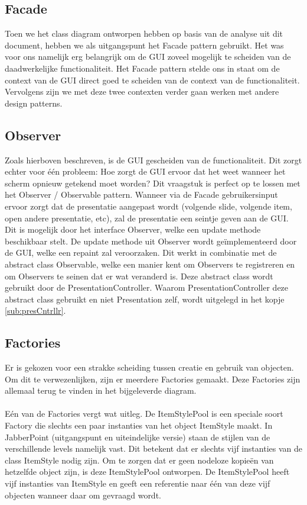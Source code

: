 \documentclass[a4paper]{article}
\newcommand{\1}[0]{\'{e}\'{e}n}
\begin{document}
\subsection{Facade}
Toen we het class diagram ontworpen hebben op basis van de analyse uit dit document, hebben we als uitgangspunt het Facade pattern gebruikt. Het was voor ons namelijk erg belangrijk om de GUI zoveel mogelijk te scheiden van de daadwerkelijke functionaliteit. Het Facade pattern stelde ons in staat om de context van de GUI direct goed te scheiden van de context van de functionaliteit. Vervolgens zijn we met deze twee contexten verder gaan werken met andere design patterns.

\subsection{Observer}
Zoals hierboven beschreven, is de GUI gescheiden van de functionaliteit. Dit zorgt echter voor \1 probleem: Hoe zorgt de GUI ervoor dat het weet wanneer het scherm opnieuw getekend moet worden? Dit vraagstuk is perfect op te lossen met het Observer / Observable pattern. Wanneer via de Facade gebruikersinput ervoor zorgt dat de presentatie aangepast wordt (volgende slide, volgende item, open andere presentatie, etc), zal de presentatie een seintje geven aan de GUI. Dit is mogelijk door het interface Observer, welke een update methode beschikbaar stelt. De update methode uit Observer wordt ge\"{i}mplementeerd door de GUI, welke een repaint zal veroorzaken. Dit werkt in combinatie met de abstract class Observable, welke een manier kent om Observers te registreren en om Observers te seinen dat er wat veranderd is. Deze abstract class wordt gebruikt door de PresentationController. Waarom PresentationController deze abstract class gebruikt en niet Presentation zelf, wordt uitgelegd in het kopje \ref{sub:presCntrllr}.

\subsection{Factories}
Er is gekozen voor een strakke scheiding tussen creatie en gebruik van objecten. Om dit te verwezenlijken, zijn er meerdere Factories gemaakt. Deze Factories zijn allemaal terug te vinden in het bijgeleverde diagram.
\\\\
E\'{e}n van de Factories vergt wat uitleg. De ItemStylePool is een speciale soort Factory die slechts een paar instanties van het object ItemStyle maakt. In JabberPoint (uitgangspunt en uiteindelijke versie) staan de stijlen van de verschillende levels namelijk vast. Dit betekent dat er slechts vijf instanties van de class ItemStyle nodig zijn. Om te zorgen dat er geen nodeloze kopie\"{e}n van hetzelfde object zijn, is deze ItemStylePool ontworpen. De ItemStylePool heeft vijf instanties van ItemStyle en geeft een referentie naar \1 van deze vijf objecten wanneer daar om gevraagd wordt.
\end{document}
